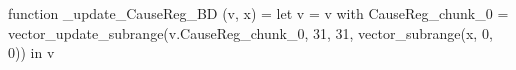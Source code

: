 function _update_CauseReg_BD (v, x) = let v = { v with CauseReg_chunk_0 = vector_update_subrange(v.CauseReg_chunk_0, 31, 31, vector_subrange(x, 0, 0)) } in v
